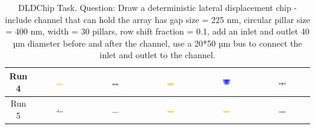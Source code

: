 \begin{table}[H]
\begin{tabular}{|c|c|c|c|c|c|}
    \hline
    Run 4 & \includegraphics[width=0.15\textwidth]{./run_4/png/gpt-4o_results/DLDChip.png} & \includegraphics[width=0.15\textwidth]{./run_4/png/claude-3-5-sonnet-20240620_results/DLDChip.png} & \includegraphics[width=0.15\textwidth]{./run_4/png/watsonx_meta-llama_llama-3-1-70b-instruct_results/DLDChip.png} & \includegraphics[width=0.15\textwidth]{./run_4/png/watsonx_meta-llama_llama-3-405b-instruct_results/DLDChip.png} & \includegraphics[width=0.15\textwidth]{./run_4/png/o1-preview_results/DLDChip.png} \\
    \hline
    Run 5 & \includegraphics[width=0.15\textwidth]{./run_5/png/gpt-4o_results/DLDChip.png} & \includegraphics[width=0.15\textwidth]{./run_5/png/claude-3-5-sonnet-20240620_results/DLDChip.png} & \includegraphics[width=0.15\textwidth]{./run_5/png/watsonx_meta-llama_llama-3-1-70b-instruct_results/DLDChip.png} & \includegraphics[width=0.15\textwidth]{./run_5/png/watsonx_meta-llama_llama-3-405b-instruct_results/DLDChip.png} & \includegraphics[width=0.15\textwidth]{./run_5/png/o1-preview_results/DLDChip.png} \\
    \hline
    \end{tabular}
    \caption{DLDChip Task. Question: Draw a deterministic lateral displacement chip - include channel that can hold the array has gap size = 225 nm, circular pillar size = 400 nm, width = 30 pillars, row shift fraction = 0.1, add an inlet and outlet 40 µm diameter before and after the channel, use a 20*50 µm bus to connect the inlet and outlet to the channel.}
\end{table}

